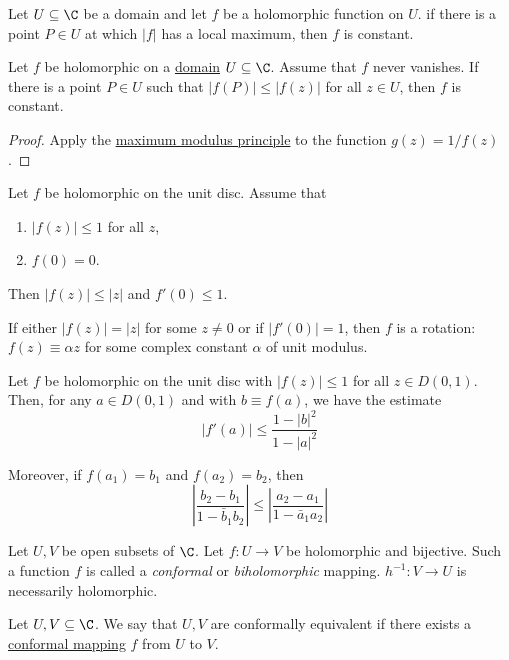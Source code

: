 \label{c3c0370}

Let $U\subseteq\C$ be a domain and let $f$ be a holomorphic function on $U$. if
there is a point $P\in U$ at which $|f|$ has a local maximum, then $f$ is
constant.

\Theorem{}\label{dc80ded}

Let $f$ be holomorphic on a \href{f2be1bc}{domain} $U\subseteq\C$. Assume that
$f$ never vanishes. If there is a point $P\in U$ such that $|f(P)|\leq |f(z)|$
for all $z\in U$, then $f$ is constant.

\begin{proof}
  Apply the \href{bfc4e84}{maximum modulus principle} to the function
  $g(z)=1/f(z)$.
\end{proof}

\label{f0c9fe2}

Let $f$ be holomorphic on the unit disc. Assume that
\begin{enumerate}
  \item $|f(z)|\leq1$ for all $z$,
  \item $f(0)=0$.
\end{enumerate}

Then $|f(z)|\leq|z|$ and $f'(0)\leq1$.

If either $|f(z)|=|z|$ for some $z\neq0$ or if $|f'(0)|=1$, then $f$ is a
rotation: $f(z)\equiv\alpha z$ for some complex constant $\alpha$ of unit
modulus.

\label{a244534}

Let $f$ be holomorphic on the unit disc with $|f(z)|\leq1$ for all $z\in
D(0,1)$. Then, for any $a\in D(0,1)$ and with $b\equiv f(a)$, we have the
estimate
$$
  |f'(a)|\leq\frac{1-|b|^2}{1-|a|^2}
$$

Moreover, if $f(a_1)=b_1$ and $f(a_2)=b_2$, then
$$
  \left|\frac{b_2-b_1}{1-\bar b_1b_2}\right|
  \leq
  \left|\frac{a_2-a_1}{1-\bar a_1a_2}\right|
$$

\label{bbb1df0}

Let $U,V$ be open subsets of $\C$. Let $f:U\to V$ be holomorphic and bijective.
Such a function $f$ is called a \textit{conformal} or \textit{biholomorphic}
mapping. $h^{-1}:V\to U$ is necessarily holomorphic.


\label{ee69976}

Let $U,V\subseteq\C$. We say that $U,V$ are conformally equivalent if there
exists a \href{bbb1df0}{conformal mapping} $f$ from $U$ to $V$.

